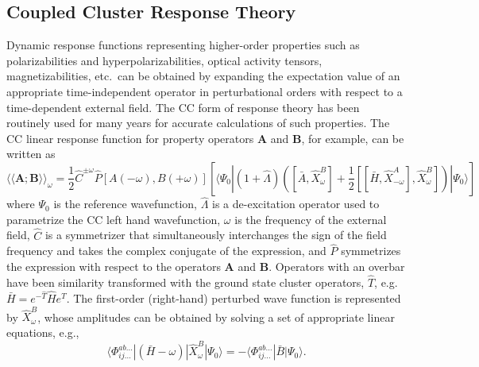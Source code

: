\subsection{Coupled Cluster Response Theory}

Dynamic response functions representing higher-order properties such as
polarizabilities and hyperpolarizabilities, optical activity tensors,
magnetizabilities, etc.\ can be obtained by expanding the expectation value of
an appropriate time-independent operator in perturbational orders with respect
to a time-dependent external field.  The CC form of response
theory has been routinely used for many years for accurate calculations of
such properties.\cite{Helgaker12} The CC linear response function for
property operators $\bm{A}$ and $\bm{B}$, for example, can be written
as
\begin{equation}
{\langle\langle\bm{A};\bm{B}\rangle\rangle}_\omega=
\frac{1}{2}\hat{C}^{\pm\omega}\hat{P}[A(-\omega),B(+\omega)] \left[
\langle\Psi_0|(1+\hat{\Lambda})\left( [\bar{A},\hat{X}^B_{\omega}] +
\frac{1}{2}[[\bar{H},\hat{X}^{A}_{-\omega}], \hat{X}^{B}_{\omega}]
\right) |\Psi_0\rangle \right]
\label{Eq:linresp}
\end{equation}
where $\Psi_0$ is the reference wavefunction, $\hat{\Lambda}$ is a
de-excitation operator used to parametrize the CC left hand wavefunction,
$\omega$ is the frequency of the external field, $\hat{C}$ is a symmetrizer
that simultaneously interchanges the sign of the field frequency and takes the
complex conjugate of the expression, and $\hat{P}$ symmetrizes the expression
with respect to the operators $\bm{A}$ and $\bm{B}$. Operators with an
overbar have been similarity transformed with the ground state cluster
operators, $\hat{T}$, e.g. $\bar{H} = e^{-\hat{T}}\hat{H}e^{\hat{T}}$. The
first-order (right-hand) perturbed wave function is represented by
${\hat{X}^{B}_{\omega}}$, whose amplitudes can be obtained by solving a set
of appropriate linear equations, e.g.,
\begin{equation}
\langle\Phi_{ij\ldots}^{ab\ldots}|(\bar{H}-\omega)|\hat{X}^{B}_{\omega}|\Psi_0\rangle
= -\langle\Phi_{ij\ldots}^{ab\ldots}|\bar{B}|\Psi_0\rangle.
\label{Eq:perturbed_wfn}
\end{equation} 

